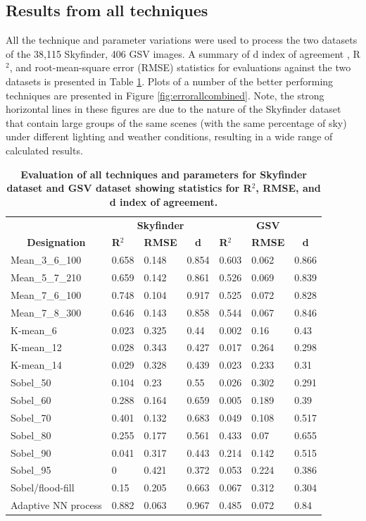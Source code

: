 \documentclass[final,3p,times,authoryear]{elsarticle}
\begin{document}
\subsection{Results from all techniques}\label{sec:resultsall}
All the technique and parameter variations were used to process the two datasets of the 38,115 Skyfinder, 406 GSV images. A summary of d index of agreement \citep{Willmott1981}, R$^{2}$, and root-mean-square error (RMSE) statistics for evaluations against the two datasets is presented in Table \ref{tab:evalall}. Plots of a number of the better performing techniques are presented in Figure \ref{fig:errorallcombined}. Note, the strong horizontal lines in these figures are due to the nature of the Skyfinder dataset that contain large groups of the same scenes (with the same percentage of sky) under different lighting and weather conditions, resulting in a wide range of calculated results.

\begin{table}[!htbp]
\caption{\bf Evaluation of all techniques and parameters for Skyfinder dataset and GSV dataset showing statistics for R$^{2}$, RMSE, and d index of agreement. \label{tab:evalall}}     
\begin{tabular}{ l l l l l l l }
\multicolumn{1}{c}{\textbf{~}}
& \multicolumn{3}{c}{\textbf{Skyfinder}}
& \multicolumn{3}{c}{\textbf{GSV}}
\\ 
 \multicolumn{1}{c|}{\textbf{Designation}}
& \textbf{R$^{2}$} 
& \textbf{RMSE} 
& \multicolumn{1}{c|}{\textbf{d}}
& \textbf{R$^{2}$} 
& \textbf{RMSE}  
& \multicolumn{1}{c|}{\textbf{d}}
\\ \hline
Mean\_3\_6\_100	&0.658&0.148&0.854&0.603&0.062&0.866 \\
Mean\_5\_7\_210	&0.659&0.142&0.861&0.526&0.069&0.839 \\
Mean\_7\_6\_100	&0.748&0.104&0.917&0.525&0.072&0.828 \\
Mean\_7\_8\_300 &0.646&0.143&0.858&0.544&0.067&0.846  \\
K-mean\_6       &0.023&0.325&0.44&0.002&0.16  &0.43 \\
K-mean\_12      &0.028&0.343&0.427&0.017&0.264&0.298 \\
K-mean\_14      &0.029&0.328&0.439&0.023&0.233&0.31 \\
Sobel\_50       &0.104&0.23 &0.55&0.026&0.302&0.291 \\
Sobel\_60       &0.288&0.164&0.659&0.005&0.189&0.39 \\
Sobel\_70       &0.401&0.132&0.683&0.049&0.108&0.517 \\
Sobel\_80       &0.255&0.177&0.561&0.433&0.07 &0.655 \\
Sobel\_90       &0.041&0.317&0.443&0.214&0.142&0.515 \\
Sobel\_95       &0    &0.421&0.372&0.053&0.224&0.386 \\
\hline
Sobel/flood-fill&0.15&0.205&0.663&0.067&0.312&0.304 \\
\hline
Adaptive NN process&0.882&0.063&0.967&0.485&0.072&0.84 \\
\hline
\end{tabular}
\end{table}
\end{document}
